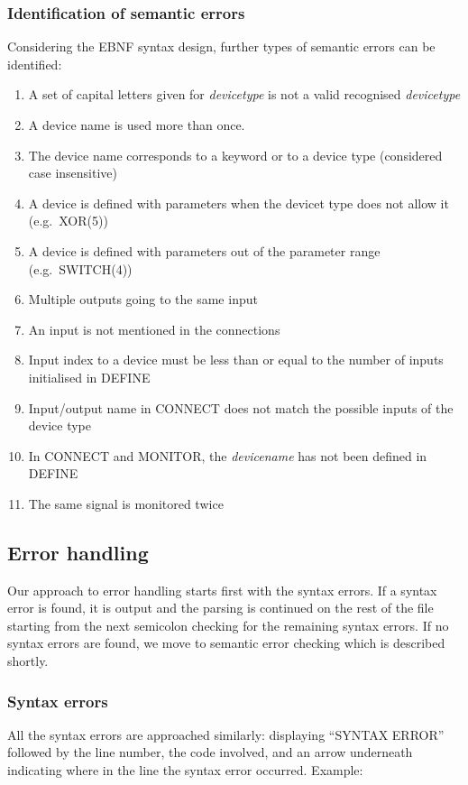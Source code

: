 \documentclass[a4paper,11pt]{article}
\providecommand{\tightlist}{%
	\setlength{\itemsep}{0pt}\setlength{\parskip}{0pt}}
\numberwithin{equation}{section}
\begin{document}
\subsubsection{Identification of semantic errors} \label{ident_sem_error}
Considering the EBNF syntax design, further types of semantic errors can be identified:
\begin{enumerate}
	\tightlist
	\item A set of capital letters given for \textit{devicetype} is not a valid recognised \textit{devicetype}
	\item A device name is used more than once.
	\item The device name corresponds to a keyword or to a device type (considered case insensitive)
	\item A device is defined with parameters when the devicet type does not allow it (e.g.~XOR(5))
	\item A device is defined with parameters out of the parameter range (e.g.~SWITCH(4))
	\item Multiple outputs going to the same input
	\item An input is not mentioned in the connections
	\item Input index to a device must be less than or equal to the number of inputs initialised in DEFINE
	\item Input/output name in CONNECT does not match the possible inputs of the device type
	\item In CONNECT and MONITOR, the \textit{devicename} has not been defined in DEFINE
	\item The same signal is monitored twice
\end{enumerate}

\subsection{Error handling}
Our approach to error handling starts first with the syntax errors. If a syntax error is found, it is output and the parsing is continued on the rest of the file starting from the next semicolon checking for the remaining syntax errors. If no syntax errors are found, we move to semantic error checking which is described shortly.
\subsubsection{Syntax errors}
All the syntax errors are approached similarly: displaying “SYNTAX ERROR” followed by the line number, the code involved, and an arrow underneath indicating where in the line the syntax error occurred. Example:
\end{document}

